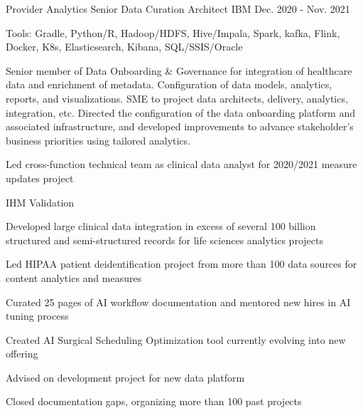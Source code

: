 \begin{cventries}
  \cvexpentry
    {Provider Analytics} %
    {Senior Data Curation Architect} %
    {IBM}
    {Dec. 2020 - Nov. 2021}
    {
      \begin{cvheavyparagraph}
        Tools: Gradle, Python/R, Hadoop/HDFS, Hive/Impala, Spark, kafka, Flink, Docker, K8s, Elasticsearch, Kibana, SQL/SSIS/Oracle
      \end{cvheavyparagraph}
    }
    {
      \begin{cvparagraph}
        Senior member of Data Onboarding \& Governance for integration of healthcare data and enrichment of metadata. Configuration of data models, analytics, reports, and visualizations. SME to project data architects, delivery, analytics, integration, etc. Directed the configuration of the data onboarding platform and associated infrastructure, and developed improvements to advance stakeholder’s business priorities using tailored analytics.
      \end{cvparagraph}
      \begin{cvitems} %
        \item {Led cross-function technical team as clinical data analyst for 2020/2021 measure updates project}
        \item {IHM Validation}
        \item {Developed large clinical data integration in excess of several 100 billion structured and semi-structured records for life sciences analytics projects}
        \item {Led HIPAA patient deidentification project from more than 100 data sources for content analytics and measures}
        \item {Curated 25 pages of AI workflow documentation and mentored new hires in AI tuning process}
        \item {Created AI Surgical Scheduling Optimization tool currently evolving into new offering}
        \item {Advised on development project for new data platform}
        \item {Closed documentation gaps, organizing more than 100 past projects}
      \end{cvitems}
    }


\end{cventries}
